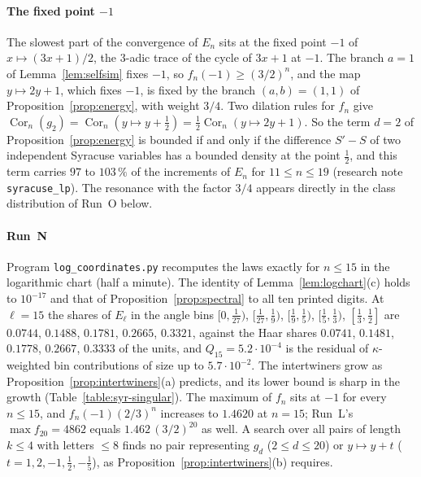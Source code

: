 \documentclass[12pt]{amsart}
\theoremstyle{definition}
\theoremstyle{remark}
\begin{document}
\paragraph{The fixed point $-1$} The slowest part of the convergence of $E_n$ sits at the fixed point $-1$ of $x\mapsto(3x+1)/2$, the $3$-adic trace of the cycle of $3x+1$ at $-1$. The branch $a=1$ of Lemma~\ref{lem:selfsim} fixes $-1$, so $f_n(-1)\ge(3/2)^n$, and the map $y\mapsto2y+1$, which fixes $-1$, is fixed by the branch $(a,b)=(1,1)$ of Proposition~\ref{prop:energy}, with weight $3/4$. Two dilation rules for $f_n$ give $\operatorname{Cor}_n(g_2)=\operatorname{Cor}_n(y\mapsto y+\frac12)=\frac12\operatorname{Cor}_n(y\mapsto2y+1)$. So the term $d=2$ of Proposition~\ref{prop:energy} is bounded if and only if the difference $S'-S$ of two independent Syracuse variables has a bounded density at the point $\frac12$, and this term carries $97$ to $103\,\%$ of the increments of $E_n$ for $11\le n\le19$ (research note \texttt{syracuse\_lp}). The resonance with the factor $3/4$ appears directly in the class distribution of Run~O below.

\paragraph{Run~N} Program \texttt{log\_coordinates.py} recomputes the laws exactly for $n\le15$ in the logarithmic chart (half a minute). The identity of Lemma~\ref{lem:logchart}(c) holds to $10^{-17}$ and that of Proposition~\ref{prop:spectral} to all ten printed digits. At $\ell=15$ the shares of $E_\ell$ in the angle bins $[0,\frac1{27})$, $[\frac1{27},\frac19)$, $[\frac19,\frac15)$, $[\frac15,\frac13)$, $[\frac13,\frac12]$ are $0.0744$, $0.1488$, $0.1781$, $0.2665$, $0.3321$, against the Haar shares $0.0741$, $0.1481$, $0.1778$, $0.2667$, $0.3333$ of the units, and $Q_{15}=5.2\cdot10^{-4}$ is the residual of $\kappa$-weighted bin contributions of size up to $5.7\cdot10^{-2}$. The intertwiners grow as Proposition~\ref{prop:intertwiners}(a) predicts, and its lower bound is sharp in the growth (Table~\ref{table:syr-singular}). The maximum of $f_n$ sits at $-1$ for every $n\le15$, and $f_n(-1)(2/3)^n$ increases to $1.4620$ at $n=15$; Run~L's $\max f_{20}=4862$ equals $1.462\,(3/2)^{20}$ as well. A search over all pairs of length $k\le4$ with letters $\le8$ finds no pair representing $g_d$ ($2\le d\le20$) or $y\mapsto y+t$ ($t=1,2,-1,\frac12,-\frac15$), as Proposition~\ref{prop:intertwiners}(b) requires.
\end{document}
